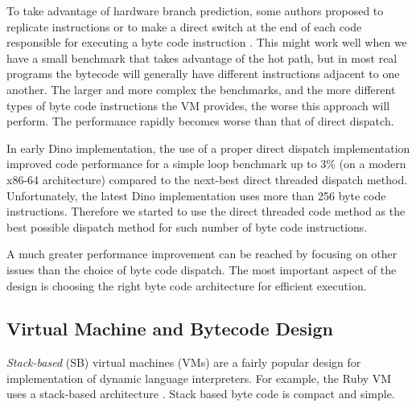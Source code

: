 \documentclass[preprint]{sigplanconf}
\begin{document}
  To take advantage of hardware branch prediction, some authors proposed
to replicate instructions or to make a direct switch
at the end of each code responsible for executing a byte code instruction \cite{Casey}.  This
might work well when we have a small benchmark that takes advantage of the hot path,
but in most real programs the bytecode will generally have different instructions adjacent to one another. %
The larger and more complex the benchmarks, and the more different types of
byte code instructions the VM provides, the worse this approach will perform.
The performance rapidly becomes worse than that of direct dispatch.

  In early Dino implementation, the use of a proper direct dispatch implementation improved
code performance for a simple loop benchmark up to 3\% (on a modern
x86-64 architecture) compared to the next-best direct threaded
dispatch method.  Unfortunately, the latest Dino implementation uses more
than 256 byte code instructions.  Therefore we started to use the direct threaded code
method as the best possible dispatch method for such number of byte
code instructions.

  A much greater performance improvement can be reached by focusing on other
issues than the choice of byte code dispatch.  The most important aspect of the design
is choosing the right byte code architecture for efficient execution.

\subsection{Virtual Machine and Bytecode Design}

  \emph{Stack-based} (SB) virtual machines (VMs) are a fairly popular design for
implementation of dynamic language interpreters. For example, the Ruby
VM uses a stack-based architecture \cite{Sasada} \cite{Shaughnessy}.  Stack based byte
code is compact and simple.
\end{document}
